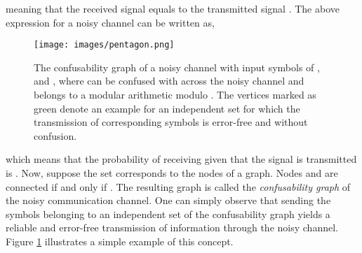 \documentclass{article}
\begin{document}
meaning that the received signal  equals to the transmitted signal . The above expression for a noisy channel can be written as,
	
\begin{figure}[t]
	\begin{center}
		\centerline{\texttt{[image: images/pentagon.png]}}
		\caption{The confusability graph of a noisy channel with input symbols of , and , where  can be confused with  across the noisy channel and  belongs to a modular arithmetic modulo . The vertices marked as green denote an example for an independent set for which the transmission of corresponding symbols is error-free and without confusion.}
		\label{fig: pentagon}
	\end{center}
\end{figure}
which means that the probability of receiving  given that the signal  is transmitted is . Now, suppose the set  corresponds to the nodes of a graph. Nodes  and  are connected if and only if . The resulting graph is called the \textit{confusability graph} of the noisy communication channel. One can simply observe that sending the symbols belonging to an independent set of the confusability graph yields a reliable and error-free transmission of information through the noisy channel. Figure \ref{fig: pentagon} illustrates a simple example of this concept.
\end{document}
